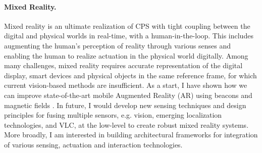 \documentclass[10pt]{article}
\begin{document}

\paragraph{Mixed Reality. }
Mixed reality is an ultimate realization of CPS with tight coupling between the digital and physical worlds in real-time, with a human-in-the-loop. %
This includes augmenting the human's perception of reality through various senses and enabling the human to realize actuation in the physical world digitally. Among many challenges, 
mixed reality requires accurate representation of the digital display, smart devices and physical objects in the same reference frame, for which current vision-based methods are insufficient.  As a start, I have shown how we can improve state-of-the-art mobile Augmented Reality (AR) using beacons and magnetic fields \cite{mobileAR}. In future, I would develop new sensing techniques and  design principles for fusing multiple sensors, e.g. vision, emerging localization technologies, and VLC, at the low-level to create robust mixed reality systems. More broadly, I am interested in building architectural frameworks for integration of various sensing, actuation and interaction technologies. \\
\end{document}
